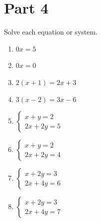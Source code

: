 \documentclass[10pt]{article}
\theoremstyle{definition}
\theoremstyle{plain}
\numberwithin{equation}{section}
\begin{document}
\section*{Part 4}
\begin{multicolblock}{Solve each equation or system.}
\begin{enumerate}
  \item $0x = 5$
  \item $0x = 0$
  \item $2(x+1) = 2x + 3$
  \item $3(x-2) = 3x - 6$
  \item $\begin{cases} x + y = 2 \\[4pt] 2x + 2y = 5 \end{cases}$
  \item $\begin{cases} x + y = 2 \\[4pt] 2x + 2y = 4 \end{cases}$
  \item $\begin{cases} x + 2y = 3 \\[4pt] 2x + 4y = 6 \end{cases}$
  \item $\begin{cases} x + 2y = 3 \\[4pt] 2x + 4y = 7 \end{cases}$
\end{enumerate}
\end{multicolblock}
\end{document}
